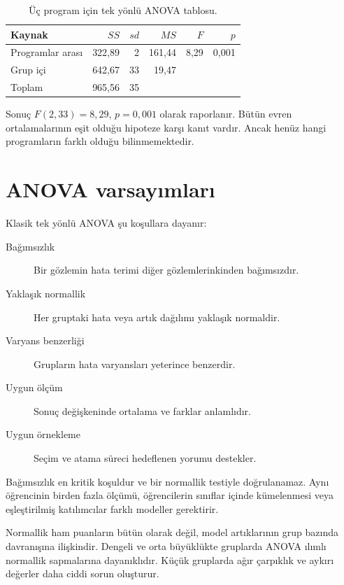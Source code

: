 \begin{table}[htbp]
\centering
\caption{Üç program için tek yönlü ANOVA tablosu.}
\begin{tabular}{@{}lrrrrr@{}}
\toprule
Kaynak & $SS$ & $sd$ & $MS$ & $F$ & $p$ \\
\midrule
Programlar arası & 322,89 & 2 & 161,44 & 8,29 & 0,001 \\
Grup içi & 642,67 & 33 & 19,47 & & \\
Toplam & 965,56 & 35 & & & \\
\bottomrule
\end{tabular}
\end{table}

Sonuç $F(2,33)=8{,}29$, $p=0{,}001$ olarak raporlanır. Bütün evren
ortalamalarının eşit olduğu hipoteze karşı kanıt vardır. Ancak henüz hangi
programların farklı olduğu bilinmemektedir.

\section{ANOVA varsayımları}

Klasik tek yönlü ANOVA şu koşullara dayanır:

\begin{description}
  \item[Bağımsızlık] Bir gözlemin hata terimi diğer gözlemlerinkinden bağımsızdır.
  \item[Yaklaşık normallik] Her gruptaki hata veya artık dağılımı yaklaşık normaldir.
  \item[Varyans benzerliği] Grupların hata varyansları yeterince benzerdir.
  \item[Uygun ölçüm] Sonuç değişkeninde ortalama ve farklar anlamlıdır.
  \item[Uygun örnekleme] Seçim ve atama süreci hedeflenen yorumu destekler.
\end{description}

Bağımsızlık en kritik koşuldur ve bir normallik testiyle doğrulanamaz. Aynı
öğrencinin birden fazla ölçümü, öğrencilerin sınıflar içinde kümelenmesi veya
eşleştirilmiş katılımcılar farklı modeller gerektirir.

Normallik ham puanların bütün olarak değil, model artıklarının grup bazında
davranışına ilişkindir. Dengeli ve orta büyüklükte gruplarda ANOVA ılımlı
normallik sapmalarına dayanıklıdır. Küçük gruplarda ağır çarpıklık ve aykırı
değerler daha ciddi sorun oluşturur.

